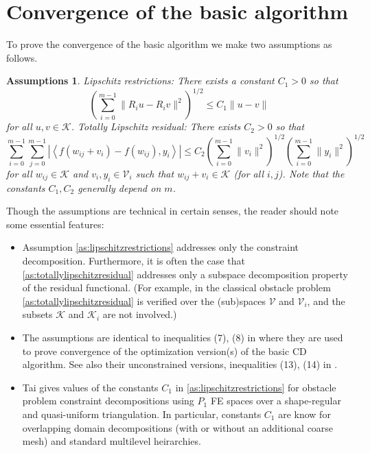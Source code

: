 \documentclass[letterpaper,final,12pt,reqno]{amsart}
\theoremstyle{cstyle}
\theoremstyle{cstyle*}
\newtheorem{assumptions*}{Assumptions}
\theoremstyle{dstyle}
\numberwithin{equation}{section}
\numberwithin{figure}{section}
\numberwithin{table}{section}
\numberwithin{theorem}{section}
\newcommand{\cK}{\mathcal{K}}
\newcommand{\cV}{\mathcal{V}}
\newcommand{\ip}[2]{\left<#1,#2\right>}
\begin{document}
\section{Convergence of the basic algorithm} \label{sec:convergence}

To prove the convergence of the basic algorithm we make two assumptions as follows.

\begin{assumptions*}  \emph{Lipschitz restrictions}: There exists a constant $C_1>0$ so that
\begin{equation}
\left(\sum_{i=0}^{m-1} \|R_i u - R_i v\|^2\right)^{1/2} \le C_1 \|u-v\| \label{as:lipschitzrestrictions}
\end{equation}
for all $u,v\in\cK$.  \emph{Totally Lipschitz residual}: There exists $C_2>0$ so that
\begin{equation}
\sum_{i=0}^{m-1} \sum_{j=0}^{m-1} \left|\ip{f(w_{ij} + v_i) - f(w_{ij})}{y_i}\right| \le C_2 \left(\sum_{i=0}^{m-1} \|v_i\|^2\right)^{1/2} \left(\sum_{i=0}^{m-1} \|y_i\|^2\right)^{1/2} \label{as:totallylipschitzresidual}
\end{equation}
for all $w_{ij} \in \cK$ and $v_i,y_i \in \cV_i$ such that $w_{ij} + v_i \in \cK$ (for all $i,j$).  Note that the constants $C_1,C_2$ generally depend on $m$.
\end{assumptions*}

Though the assumptions are technical in certain senses, the reader should note some essential features:
\begin{itemize}
\item Assumption \eqref{as:lipschitzrestrictions} addresses only the constraint decomposition.  Furthermore, it is often the case that \eqref{as:totallylipschitzresidual} addresses only a subspace decomposition property of the residual functional.  (For example, in the classical obstacle problem \eqref{as:totallylipschitzresidual} is verified over the (sub)spaces $\cV$ and $\cV_i$, and the subsets $\cK$ and $\cK_i$ are not involved.)
\item The assumptions are identical to inequalities (7), (8) in \cite{Tai2003} where they are used to prove convergence of the optimization version(s) of the basic CD algorithm.  See also their unconstrained versions, inequalities (13), (14) in \cite{TaiXu2002}.
\item Tai \cite{Tai2003} gives values of the constants $C_1$ in \eqref{as:lipschitzrestrictions} for obstacle problem constraint decompositions using $P_1$ FE spaces over a shape-regular and quasi-uniform triangulation.  In particular, constants $C_1$ are know for overlapping domain decompositions (with or without an additional coarse mesh) and standard multilevel heirarchies.
\end{itemize}
\end{document}
